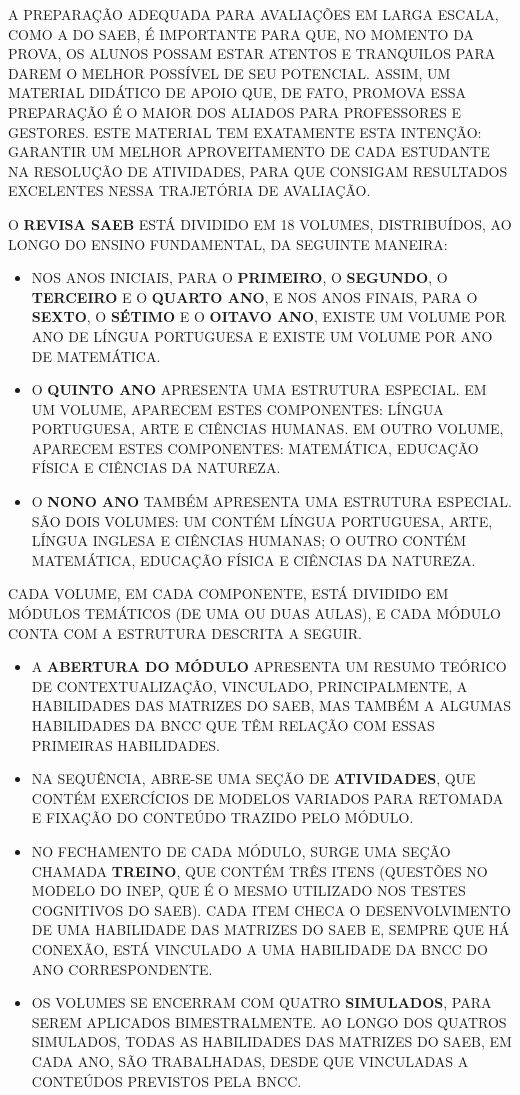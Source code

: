 A PREPARAÇÃO ADEQUADA PARA AVALIAÇÕES EM LARGA ESCALA, COMO A DO SAEB, É
IMPORTANTE PARA QUE, NO MOMENTO DA PROVA, OS ALUNOS POSSAM ESTAR ATENTOS
E TRANQUILOS PARA DAREM O MELHOR POSSÍVEL DE SEU POTENCIAL. ASSIM, UM
MATERIAL DIDÁTICO DE APOIO QUE, DE FATO, PROMOVA ESSA PREPARAÇÃO É O
MAIOR DOS ALIADOS PARA PROFESSORES E GESTORES. ESTE MATERIAL TEM
EXATAMENTE ESTA INTENÇÃO: GARANTIR UM MELHOR APROVEITAMENTO DE CADA
ESTUDANTE NA RESOLUÇÃO DE ATIVIDADES, PARA QUE CONSIGAM RESULTADOS
EXCELENTES NESSA TRAJETÓRIA DE AVALIAÇÃO.

O \textbf{REVISA SAEB} ESTÁ DIVIDIDO EM 18 VOLUMES, DISTRIBUÍDOS, AO
LONGO DO ENSINO FUNDAMENTAL, DA SEGUINTE MANEIRA:

\begin{itemize}
\item
  NOS ANOS INICIAIS, PARA O \textbf{PRIMEIRO}, O \textbf{SEGUNDO}, O
  \textbf{TERCEIRO} E O \textbf{QUARTO ANO}, E NOS ANOS FINAIS, PARA O
  \textbf{SEXTO}, O \textbf{SÉTIMO} E O \textbf{OITAVO ANO}, EXISTE UM
  VOLUME POR ANO DE LÍNGUA PORTUGUESA E EXISTE UM VOLUME POR ANO DE
  MATEMÁTICA.
\item
  O \textbf{QUINTO ANO} APRESENTA UMA ESTRUTURA ESPECIAL. EM UM VOLUME,
  APARECEM ESTES COMPONENTES: LÍNGUA PORTUGUESA, ARTE E CIÊNCIAS
  HUMANAS. EM OUTRO VOLUME, APARECEM ESTES COMPONENTES: MATEMÁTICA,
  EDUCAÇÃO FÍSICA E CIÊNCIAS DA NATUREZA.
\item
  O \textbf{NONO ANO} TAMBÉM APRESENTA UMA ESTRUTURA ESPECIAL. SÃO DOIS
  VOLUMES: UM CONTÉM LÍNGUA PORTUGUESA, ARTE, LÍNGUA INGLESA E CIÊNCIAS
  HUMANAS; O OUTRO CONTÉM MATEMÁTICA, EDUCAÇÃO FÍSICA E CIÊNCIAS DA
  NATUREZA.
\end{itemize}

CADA VOLUME, EM CADA COMPONENTE, ESTÁ DIVIDIDO EM MÓDULOS TEMÁTICOS (DE
UMA OU DUAS AULAS), E CADA MÓDULO CONTA COM A ESTRUTURA DESCRITA A
SEGUIR.

\begin{itemize}
\item
  A \textbf{ABERTURA DO MÓDULO} APRESENTA UM RESUMO TEÓRICO DE
  CONTEXTUALIZAÇÃO, VINCULADO, PRINCIPALMENTE, A HABILIDADES DAS
  MATRIZES DO SAEB, MAS TAMBÉM A ALGUMAS HABILIDADES DA BNCC QUE TÊM
  RELAÇÃO COM ESSAS PRIMEIRAS HABILIDADES.
\item
  NA SEQUÊNCIA, ABRE-SE UMA SEÇÃO DE \textbf{ATIVIDADES}, QUE CONTÉM
  EXERCÍCIOS DE MODELOS VARIADOS PARA RETOMADA E FIXAÇÃO
  DO CONTEÚDO TRAZIDO PELO MÓDULO.
\item
  NO FECHAMENTO DE CADA MÓDULO, SURGE UMA SEÇÃO CHAMADA \textbf{TREINO},
  QUE CONTÉM TRÊS ITENS (QUESTÕES NO MODELO DO INEP, QUE É O MESMO
  UTILIZADO NOS TESTES COGNITIVOS DO SAEB). CADA ITEM CHECA O
  DESENVOLVIMENTO DE UMA HABILIDADE DAS MATRIZES DO SAEB E, SEMPRE QUE
  HÁ CONEXÃO, ESTÁ VINCULADO A UMA HABILIDADE DA BNCC DO ANO
  CORRESPONDENTE.
\item
  OS VOLUMES SE ENCERRAM COM QUATRO \textbf{SIMULADOS}, PARA SEREM
  APLICADOS BIMESTRALMENTE. AO LONGO DOS QUATROS SIMULADOS, TODAS AS
  HABILIDADES DAS MATRIZES DO SAEB, EM CADA ANO, SÃO TRABALHADAS, DESDE
  QUE VINCULADAS A CONTEÚDOS PREVISTOS PELA BNCC.
\end{itemize}
